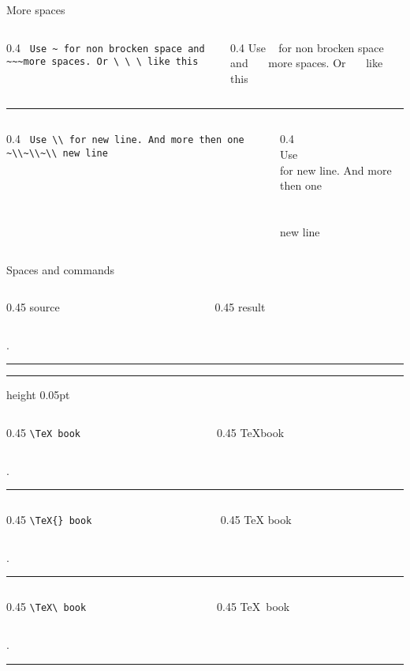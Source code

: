 \begin{frame}[fragile]{More spaces}\relax
\begin{columns}
\begin{column}{0.4\textwidth}
     \lstinline[basicstyle=\tt\normalsize]| Use ~ for non brocken space and ~~~more spaces. Or \ \ \ like this|
\end{column}
\begin{column}{0.4\textwidth}
     Use ~ for non brocken space and ~~~more spaces. Or \ \ \ like this
\end{column}
\end{columns}
\hrule
\begin{columns}
\begin{column}{0.4\textwidth}
     \lstinline[basicstyle=\tt\normalsize]| Use \\ for new line. And more then one ~\\~\\~\\ new line|
\end{column}
\begin{column}{0.4\textwidth}
~\\
     Use \\ for new line. And more then one ~\\~\\~\\ new line
\end{column}
\end{columns}

\end{frame}

\begin{frame}[fragile]{Spaces and commands}\relax

\newcommand{\appendTline}[2]{\vspace*{10pt}\begin{columns}
        \begin{column}{0.45\textwidth}
          \hfill #1 
        \end{column}
        \begin{column}{0.45\textwidth}
             \hfill #2\hfill \hfill
        \end{column}
    \end{columns}
    \vphantom.
    \hrule
    }

    \cprotect[mm]\appendTline{\csk source}{\csk result}
    \hrule height 0.05pt
    \cprotect[mm]\appendTline{\lstinline[basicstyle=\tt\normalsize,showspaces=true]|\TeX book|}{\TeX book}
    \cprotect[mm]\appendTline{\lstinline[basicstyle=\tt\normalsize,showspaces=true]|\TeX{} book|}{\TeX{} book}
    \cprotect[mm]\appendTline{\lstinline[basicstyle=\tt\normalsize,showspaces=true]|\TeX\ book|}{\TeX\ book}

\end{frame}

